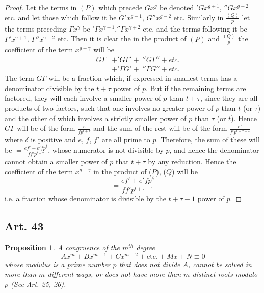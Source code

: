 \documentclass{book}
\theoremstyle{plain}
\newtheorem{proposition}{Proposition}
\theoremstyle{remark}
\begin{document}
\begin{proof}
Let the terms in $(P)$ which precede $Gx^g$ be denoted $'Gx^{g+1}$, $''Gx^{g+2}$ etc. and let those which follow it be $G'x^{g-1}$, $G''x^{g-2}$ etc.  Similarly in $\frac{(Q)}{p}$ let the terms preceding $\Gamma x^{\gamma}$ be $'\Gamma x^{\gamma+1}$,$''\Gamma x^{\gamma+2}$ etc. and the terms following it be $\Gamma' x^{\gamma+1}$, $\Gamma'' x^{\gamma+2}$ etc.  Then it is clear the in the product of $(P)$ and $\frac{(Q)}{p}$ the coefficient of the term $x^{g+\gamma}$ will be 
\begin{align} = G\Gamma& + 'G \Gamma' +\; ''G \Gamma'' + etc. \\
& + '\Gamma G' + \;''\Gamma G'' + etc. \end{align}
The term $G \Gamma$ will be a fraction which, if expressed in smallest terms has a denominator divisible by the $t + \tau$ power of $p$.  But if the remaining terms are factored, they will each involve a smaller power of $p$ than $t + \tau$, since they are all products of two factors, such that one involves no greater power of $p$ than $t$ (or $\tau$) and the other of which involves a strictly smaller power of $p$ than $\tau$ (or $t$).  Hence $G \Gamma$ will be of the form $\frac{e}{f p^{t + \tau}}$ and the sum of the rest will be of the form $\frac{e'}{f' p^{t + \tau - \delta}}$ where $\delta$ is positive and $e$, $f$, $f'$ are all prime to $p$.  Therefore, the sum of these will be $= \frac{ef' + e'fp^{\delta}}{ff'p^{t+\tau}}$, whose numerator is not divisible by $p$, and hence the denominator cannot obtain a smaller power of $p$ that $t + \tau$ by any reduction.    Hence the coefficient of the term $x^{g+\gamma}$ in the product of ($P$), ($Q$) will be 
\[ = \frac{ef' + e'f p^{\delta}}{ff'p^{t+\tau-1}} \]
i.e. a fraction whose denominator is divisible by the $t + \tau-1$ power of $p$. 
\end{proof}

\subsection*{Art. 43}  
\begin{proposition} A congruence of the $m^{th}$ degree
\[ Ax^m + Bx^{m-1} + Cx^{m-2} + \textrm{etc.} + Mx + N \equiv 0 \]
whose modulus is a prime number $p$ that does not divide $A$, cannot be solved in more than $m$ different ways, or does not have more than $m$ distinct roots modulo $p$ (See Art. 25, 26). \end{proposition}
\end{document}
